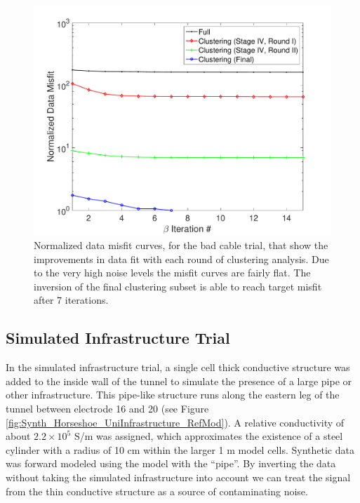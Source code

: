 \documentclass[final,authoryear,5p,times,twocolumn]{elsarticle}
\begin{document}
\begin{figure} [!ht]
	\begin{center}
	\includegraphics[trim=1.3cm 0.2cm 2.6cm 1.2cm, clip=true,width=0.75\linewidth]{./Figures/Fig24.pdf}
	\end{center}
\caption{Normalized data misfit curves, for the bad cable trial, that show the improvements in data fit with each round of clustering analysis. Due to the very high noise levels the misfit curves are fairly flat. The inversion of the final clustering subset is able to reach target misfit after 7 iterations.}
\label{fig:Synth_Horseshoe_BadCable_MisfitPlots}
\end{figure}

\subsection{Simulated Infrastructure Trial}

In the simulated infrastructure trial, a single cell thick conductive structure was added to the inside wall of the tunnel to simulate the presence of a large pipe or other infrastructure. This pipe-like structure runs along the eastern leg of the tunnel between electrode 16 and 20 (see Figure \ref{fig:Synth_Horseshoe_UniInfrastructure_RefMod}). A relative conductivity of about $2.2 \times 10^5$ S/m was assigned, which approximates the existence of a steel cylinder with a radius of 10 cm within the larger 1 m model cells. Synthetic data was forward modeled using the model with the ``pipe''. By inverting the data without taking the simulated infrastructure into account we can treat the signal from the thin conductive structure as a source of contaminating noise.
\end{document}
